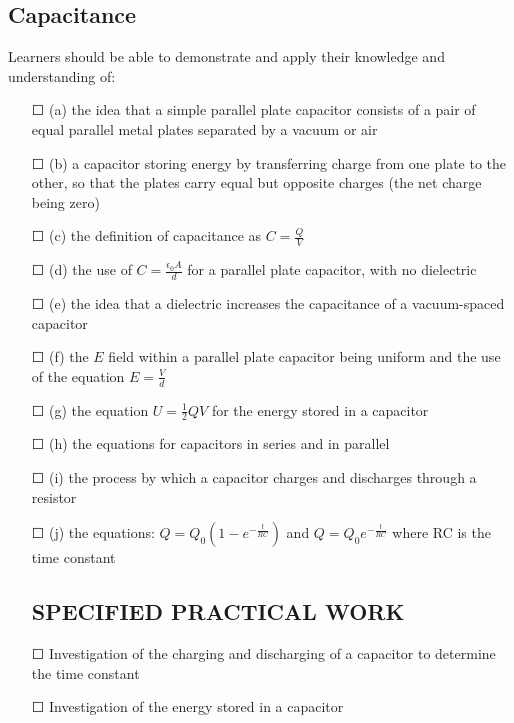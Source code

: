 \subsection{Capacitance}Learners should be able to demonstrate and apply their knowledge and
understanding of:
\begin{itemize}
	\item[\Large{$\Square$}] (a) the idea that a simple parallel plate capacitor consists of a pair of equal parallel metal plates separated by a vacuum or air
	\item[\Large{$\Square$}]		(b) a capacitor storing energy by transferring charge from one plate to the other,	so that the plates carry equal but opposite charges (the net charge being zero)
	\item[\Large{$\Square$}]		(c) the definition of capacitance as \(C=\frac{Q}{V}\)
	\item[\Large{$\Square$}]		(d) the use of \(C=\frac{\epsilon_{0} A}{d}\) for a parallel plate capacitor, with no dielectric
	\item[\Large{$\Square$}]		(e) the idea that a dielectric increases the capacitance of a vacuum-spaced
	capacitor
	\item[\Large{$\Square$}]		(f) the $E$ field within a parallel plate capacitor being uniform and the use of the
	equation \(E=\frac{V}{d}\)
	\item[\Large{$\Square$}]	(g) the equation \(U=\frac{1}{2}QV \) for the energy stored in a capacitor
	\item[\Large{$\Square$}]		(h) the equations for capacitors in \sq series and in \sq parallel
	\item[\Large{$\Square$}]		(i) the process by which a capacitor charges and discharges through a resistor
	\item[\Large{$\Square$}]		(j) the equations: \sq \(Q=Q_{0} \left( 1-e^{-\frac{t}{RC}}\right) \) and \sq \(Q=Q_{0}e^{-\frac{t}{RC}} \) where RC is the time
	constant
	\subsection*{SPECIFIED PRACTICAL WORK}
	\item[\Large{$\Square$}] Investigation of the charging and discharging of a capacitor to determine the	time constant
	\item[\Large{$\Square$}]Investigation of the energy stored in a capacitor
\end{itemize}
